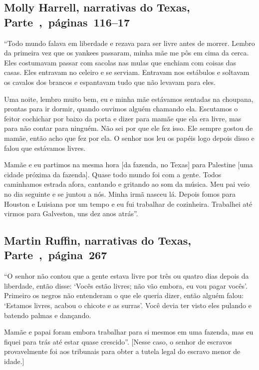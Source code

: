 \subsection{Molly Harrell, narrativas do Texas, Parte~,~páginas~116--17}
\label{ref122}

``Todo mundo falava em liberdade e rezava para ser livre antes de
morrer. Lembro da primeira vez que os yankees passaram, minha mãe me pôs
em cima da cerca. Eles costumavam passar com sacolas nas mulas que
enchiam com coisas das casas. Eles entravam no celeiro e se serviam.
Entravam nos estábulos e soltavam os cavalos dos brancos e espantavam
tudo que não levavam para eles.

Uma noite, lembro muito bem, eu e minha mãe estávamos sentadas na
choupana, prontas para ir dormir, quando ouvimos alguém chamando ela.
Escutamos o feitor cochichar por baixo da porta e dizer para mamãe que
ela era livre, mas para não contar para ninguém. Não sei por que ele fez
isso. Ele sempre gostou de mamãe, então acho que fez por ela. O senhor
nos leu os papéis logo depois disso e falou que estávamos livres.

Mamãe e eu partimos na mesma hora {[}da fazenda, no Texas{]} para
Palestine {[}uma cidade próxima da fazenda{]}. Quase todo mundo foi com
a gente. Todos caminhamos estrada afora, cantando e gritando ao som da
música. Meu pai veio no dia seguinte e se juntou a nós. Minha irmã
nasceu lá. Depois fomos para Houston e Luisiana por um tempo e eu fui
trabalhar de cozinheira. Trabalhei até virmos para Galveston, uns dez
anos atrás''.

\subsection{Martin Ruffin, narrativas do Texas, Parte~,~página~267}
\label{ref234}

``O senhor não contou que a gente estava livre por três ou quatro dias
depois da liberdade, então disse: `Vocês estão livres; não vão embora,
eu vou pagar vocês'. Primeiro os negros não entenderam o que ele queria
dizer, então alguém falou: `Estamos livres, acabou o chicote e as
surras'. Você devia ter visto eles pulando e batendo palmas e dançando.

Mamãe e papai foram embora trabalhar para si mesmos em uma fazenda, mas
eu fiquei para trás até estar quase crescido''. {[}Nesse caso, o senhor de
escravos provavelmente foi aos tribunais para obter a tutela legal do
escravo menor de idade.{]}

